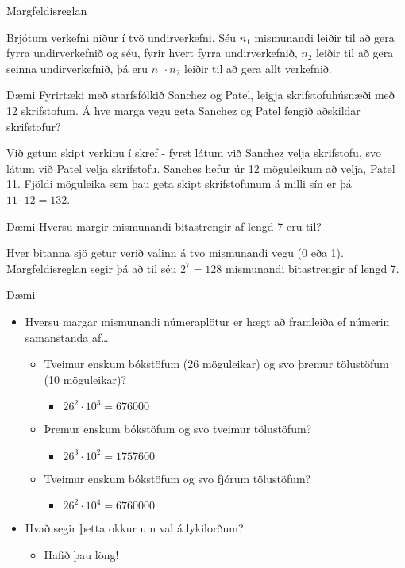 \documentclass{beamer}
\begin{document}
\begin{frame}{Margfeldisreglan}
\begin{tcolorbox}[title=Margfeldisreglan]
Brjótum verkefni niður í tvö undirverkefni. Séu $n_1$ mismunandi leiðir til að gera fyrra undirverkefnið og séu, fyrir hvert fyrra undirverkefnið, $n_2$ leiðir til að gera seinna undirverkefnið, þá eru $n_1 \cdot n_2$ leiðir til að gera allt verkefnið.
\end{tcolorbox}
\end{frame}

\begin{frame}{Dæmi}
Fyrirtæki með starfsfólkið Sanchez og Patel, leigja skrifstofuhúsnæði með 12 skrifstofum. Á hve marga vegu geta Sanchez og Patel fengið aðskildar skrifstofur?
\pause

\vspace{1cm}
Við getum skipt verkinu í skref - fyrst látum við Sanchez velja skrifstofu, svo látum við Patel velja skrifstofu. Sanches hefur úr 12 möguleikum að velja, Patel 11. Fjöldi möguleika sem þau geta skipt skrifstofunum á milli sín er þá $11 \cdot 12 = 132$.
\end{frame}

\begin{frame}{Dæmi}
Hversu margir mismunandi bitastrengir af lengd 7 eru til?
\pause

\vspace{1cm}
Hver bitanna sjö getur verið valinn á tvo mismunandi vegu (0 eða 1). Margfeldisreglan segir þá að til séu $2^7 = 128$ mismunandi bitastrengir af lengd 7.
\end{frame}

\begin{frame}{Dæmi}
\begin{itemize}
 \item Hversu margar mismunandi númeraplötur er hægt að framleiða ef númerin samanstanda af\ldots
 \begin{itemize}
  \item Tveimur enskum bókstöfum (26 möguleikar) og svo þremur tölustöfum (10 möguleikar)? \pause
  \begin{itemize}
   \item $26^2 \cdot 10^3 = 676000$
  \end{itemize}
  \item Þremur enskum bókstöfum og svo tveimur tölustöfum? \pause
  \begin{itemize}
   \item $26^3 \cdot 10^2 = 1757600$
  \end{itemize}
  \item Tveimur enskum bókstöfum og svo fjórum tölustöfum? \pause
  \begin{itemize}
   \item $26^2 \cdot 10^4 = 6760000$
  \end{itemize}
 \end{itemize}
 \item Hvað segir þetta okkur um val á lykilorðum? \pause
 \begin{itemize}
  \item Hafið þau löng!
 \end{itemize}
\end{itemize}
\end{frame}
\end{document}
